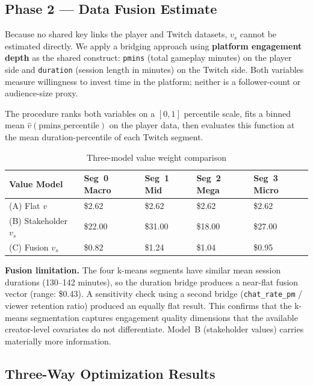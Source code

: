 \documentclass[11pt,letterpaper]{article}
\begin{document}
\subsection{Phase 2 --- Data Fusion Estimate}

Because no shared key links the player and Twitch datasets, $v_s$ cannot be
estimated directly. We apply a bridging approach using \textbf{platform
engagement depth} as the shared construct: \texttt{pmins} (total gameplay
minutes) on the player side and \texttt{duration} (session length in minutes)
on the Twitch side. Both variables measure willingness to invest time in the
platform; neither is a follower-count or audience-size proxy.

The procedure ranks both variables on a $[0,1]$ percentile scale, fits a
binned mean $\hat{v}(\text{pmins\_percentile})$ on the player data, then
evaluates this function at the mean duration-percentile of each Twitch segment.

\begin{table}[h!]
\centering
\caption{Three-model value weight comparison}
\small
\begin{tabular}{L{2.8cm} R{2.0cm} R{2.0cm} R{2.0cm} R{2.0cm}}
\toprule
\textbf{Value Model} & \textbf{Seg~0 Macro} & \textbf{Seg~1 Mid} &
\textbf{Seg~2 Mega} & \textbf{Seg~3 Micro} \\
\midrule
(A) Flat $v$        & \$2.62 & \$2.62 & \$2.62 & \$2.62 \\
(B) Stakeholder $v_s$ & \$22.00 & \$31.00 & \$18.00 & \$27.00 \\
(C) Fusion $v_s$    & \$0.82 & \$1.24 & \$1.04 & \$0.95 \\
\bottomrule
\end{tabular}
\end{table}

\textbf{Fusion limitation.} The four k-means segments have similar mean session
durations (130--142 minutes), so the duration bridge produces a near-flat
fusion vector (range: \$0.43). A sensitivity check using a second bridge
(\texttt{chat\_rate\_pm} / viewer retention ratio) produced an equally flat
result. This confirms that the k-means segmentation captures engagement
quality dimensions that the available creator-level covariates do not
differentiate. Model~B (stakeholder values) carries materially more information.

\subsection{Three-Way Optimization Results}
\end{document}
